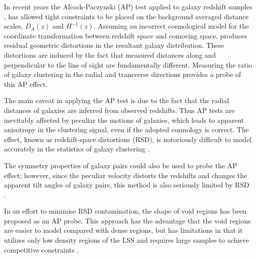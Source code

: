 \documentclass[prl,twocolumn,superscriptaddress,aps,amsmath,amssymb,nofootinbib,altaffilletter]{revtex4}
\begin{document}
In recent years the Alcock-Paczynski (AP) test \citep{AP1979} applied to galaxy redshift samples \citep{Outram2004,Blake2011,Alam2016}, 
has allowed tight constraints to be placed on the background averaged distance scales, $D_A(z)$ and $H^{-1}(z)$.  
Assuming an incorrect cosmological model for the coordinate transformation between redshift space and comoving space, produces residual geometric distortions in the resultant galaxy distribution. 
These distortions are induced by the fact that measured distances along 
and perpendicular to the line of sight are fundamentally different. 
Measuring the ratio of galaxy clustering in the radial and transverse directions provides a probe of this AP effect.


The main caveat in applying the AP test is due to the fact that 
the radial distances of galaxies are inferred from observed redshifts.
Thus AP tests are inevitably affected by peculiar the motions of galaxies,
which leads to apparent anisotropy in the clustering signal, even if the adopted cosmology is correct.
The effect, known as redshift-space distortions (RSD),
is notoriously difficult to model accurately in the statistics of galaxy clustering \citep{Ballinger1996}.

The symmetry properties of galaxy pairs\cite{Marinoni2010}  could also be used to probe the AP effect;
however, since the peculiar velocity distorts the redshifts and changes the apparent tilt angles of galaxy pairs,
this method is also seriously limited by RSD \citep{Jennings2011}.

In an effort to minimise RSD contamination, the shape of void regions\cite{Ryden1995,LavausWandelt1995}  has been 
proposed as an AP probe. This approach has the advantage that the void regions are easier to model compared with dense regions, but has limitations in that it utilizes only low density regions of the LSS and requires large samples to achieve competitive constraints \citep{Qingqing2016}.

\end{document}
